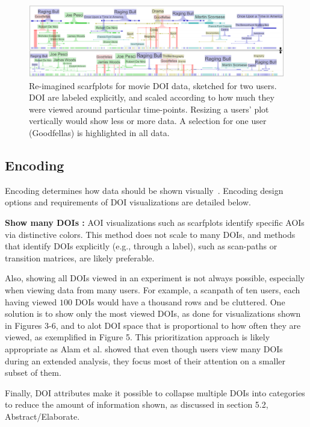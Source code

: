 \begin{figure}
  \centering
  \includegraphics[width=0.95\linewidth]{images/Scarfs.eps}
  \caption{Re-imagined scarfplots for movie DOI data, sketched for two users. DOI are labeled explicitly, and scaled according to how much they were viewed around particular time-points. Resizing a users' plot vertically would show less or more data. A selection for one user (Goodfellas) is highlighted in all data. }
	\label{fig:scarfs}
\end{figure}

\subsection{Encoding}
\label{sec:Encoding}
Encoding determines how data should be shown visually~\cite{yi2007toward}. Encoding design options and requirements of DOI visualizations are detailed below.

\noindent \textbf{Show many DOIs :} AOI visualizations such as scarfplots identify specific AOIs via distinctive colors. This method does not scale to many DOIs, and methods that identify DOIs explicitly (e.g., through a label), such as scan-paths or transition matrices, are likely preferable. 

Also, showing all DOIs viewed in an experiment is not always possible, especially when viewing data from many users. For example, a scanpath of ten users, each having viewed $100$ DOIs would have a thousand rows and be cluttered. One solution is to show only the most viewed DOIs, as done for visualizations shown in Figures 3-6, and to alot DOI space that is proportional to how often they are viewed, as exemplified in Figure 5. This prioritization approach is likely appropriate as Alam et al. showed that even though users view many DOIs during an extended analysis, they focus most of their attention on a smaller subset of them. 

Finally, DOI attributes make it possible to collapse multiple DOIs into categories to reduce the amount of information shown, as discussed in section 5.2, Abstract/Elaborate.

